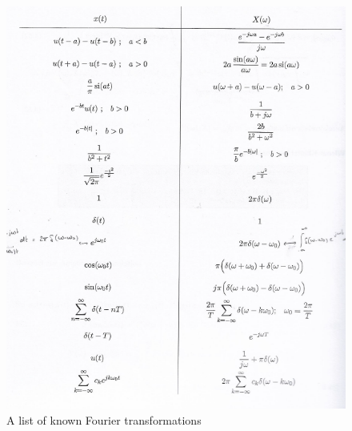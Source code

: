\documentclass[10pt,a4paper]{article}
\begin{document}
\begin{figure}[H]
\centering
\includegraphics[scale=1]{1FourierContIdentities.PNG}
\caption{A list of known Fourier transformations}
\end{figure}

\newpage
\end{document}
